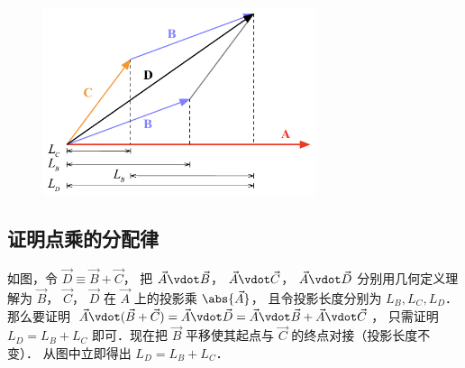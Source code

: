 \begin{figure}[ht]
\centering
\includegraphics[width=8cm]{./figures/Dot2.pdf}
\end{figure}

\subsection{证明点乘的分配律}

如图，令 $\vec D \equiv \vec B + \vec C$， 把 $\vec A \vdot \vec B$，  $\vec A \vdot \vec C$，  $\vec A \vdot \vec D$ 分别用几何定义理解为 $\vec B$，  $\vec C$，  $\vec D$ 在 $\vec A$ 上的投影乘 $\abs{\vec A}$， 且令投影长度分别为 $L_B, L_C, L_D$． 那么要证明 $\vec A \vdot (\vec B + \vec C) = \vec A \vdot \vec D = \vec A \vdot \vec B + \vec A \vdot \vec C$， 只需证明 $L_D = L_B + L_C$ 即可．现在把 $\vec B$ 平移使其起点与 $\vec C$ 的终点对接（投影长度不变）． 从图中立即得出 $L_D = L_B + L_C$．  








